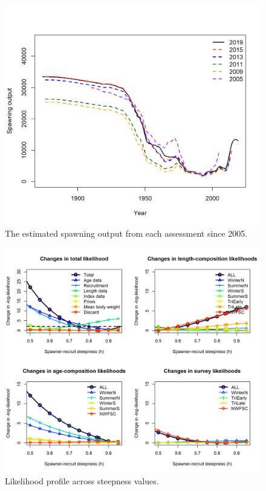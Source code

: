 \documentclass[12pt,]{article}
\begin{document}
\FloatBarrier

\begin{figure}
\centering
\includegraphics{Figures/Assessment_History.png}
\caption{The estimated spawning output from each assessment since 2005.
\label{fig:historical_analysis}}
\end{figure}

\FloatBarrier

\begin{figure}
\centering
\includegraphics{Figures/piner_panel_h.png}
\caption{Likelihood profile across steepness values.
\label{fig:piner_h}}
\end{figure}
\end{document}
